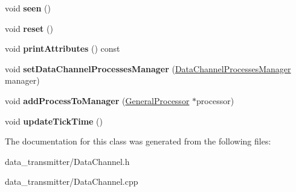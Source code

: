 \begin{DoxyCompactItemize}
\item 
\hypertarget{classDataChannel_ad543e7e4d545398af8301a1058a82ffa}{void {\bfseries seen} ()}\label{classDataChannel_ad543e7e4d545398af8301a1058a82ffa}

\item 
\hypertarget{classDataChannel_a22c6f710885f7da6e9a2061d1ad0aa51}{void {\bfseries reset} ()}\label{classDataChannel_a22c6f710885f7da6e9a2061d1ad0aa51}

\item 
\hypertarget{classDataChannel_a463fea2edbabdac150e8ee29b74ac7f6}{void {\bfseries print\-Attributes} () const }\label{classDataChannel_a463fea2edbabdac150e8ee29b74ac7f6}

\item 
\hypertarget{classDataChannel_acacc333d8c6b849b51a5c0273d4bb14d}{void {\bfseries set\-Data\-Channel\-Processes\-Manager} (\hyperlink{classDataChannelProcessesManager}{Data\-Channel\-Processes\-Manager} manager)}\label{classDataChannel_acacc333d8c6b849b51a5c0273d4bb14d}

\item 
\hypertarget{classDataChannel_afe2cb5dce4644c9f25833a8cdd20daa4}{void {\bfseries add\-Process\-To\-Manager} (\hyperlink{classGeneralProcessor}{General\-Processor} $\ast$processor)}\label{classDataChannel_afe2cb5dce4644c9f25833a8cdd20daa4}

\item 
\hypertarget{classDataChannel_a56b133d321b5d9279b43f7cbe5730896}{void {\bfseries update\-Tick\-Time} ()}\label{classDataChannel_a56b133d321b5d9279b43f7cbe5730896}

\end{DoxyCompactItemize}


The documentation for this class was generated from the following files\-:\begin{DoxyCompactItemize}
\item 
data\-\_\-transmitter/Data\-Channel.\-h\item 
data\-\_\-transmitter/Data\-Channel.\-cpp\end{DoxyCompactItemize}
